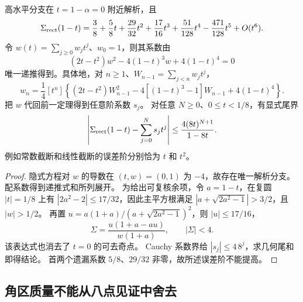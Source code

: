 \begin{proposition}[阈值的任意阶展开及显式余项]\label{wr:eight-series}
高水平分支在 $t=1-\alpha=0$ 附近解析，且
\[
 \Sigma_{\rm rect}(1-t)=\frac38+\frac58t+\frac{29}{32}t^2+
 \frac{17}{16}t^3+\frac{51}{128}t^4-\frac{471}{128}t^5+O(t^6).
\]
令 $w(t)=\sum_{j\ge0}w_jt^j$、$w_0=1$，则其系数由
\[
 (2t-t^2)w^2-4(1-t)^3w+4(1-t)^4=0
\]
唯一递推得到。具体地，对 $n\ge1$、$W_{n-1}=\sum_{j<n}w_jt^j$，
\[
 w_n=\frac14[t^n]\left\{(2t-t^2)W_{n-1}^2
 -4[(1-t)^3-1]W_{n-1}+4(1-t)^4\right\}.
\]
把 $w$ 代回前一定理得到任意阶系数 $s_j$。
对任意 $N\ge0$、$0\le t<1/8$，有显式尾界
\[
 \left|\Sigma_{\rm rect}(1-t)-\sum_{j=0}^Ns_jt^j\right|
 \le\frac{4(8t)^{N+1}}{1-8t}.
\]
例如常数截断和线性截断的误差阶分别恰为 $t$ 和 $t^2$。
\end{proposition}
\begin{proof}
隐式方程对 $w$ 的导数在 $(t,w)=(0,1)$ 为 $-4$，故存在唯一解析分支。
配系数得到递推式和所列展开。
为给出可复核余项，令 $a=1-t$，在复圆 $|t|=1/8$ 上有
$|2a^2-2|\le17/32$，因此主平方根满足
$|a+\sqrt{2a^2-1}|>3/2$，且 $|w|>1/2$。
再置 $u=a(1+a)/(a+\sqrt{2a^2-1})^2$，则 $|u|\le17/16$，
\[
 \Sigma=\frac{u(1+a-au)}{w(1+a)},\qquad |\Sigma|<4.
\]
该表达式也消去了 $t=0$ 的可去奇点。
Cauchy 系数界给 $|s_j|\le4\,8^j$，求几何尾和即得结论。
首两个遗漏系数 $5/8$、$29/32$ 非零，故所述误差阶不能提高。
\end{proof}

\subsection{角区质量不能从八点见证中舍去}

